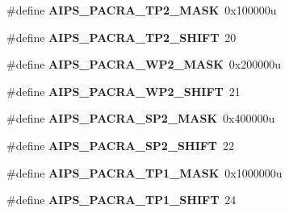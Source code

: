\begin{DoxyCompactItemize}
\item 
\hypertarget{group___a_i_p_s___register___masks_ga9f095d0133106d934d6539734fb4e0bb}{}\#define {\bfseries A\+I\+P\+S\+\_\+\+P\+A\+C\+R\+A\+\_\+\+T\+P2\+\_\+\+M\+A\+S\+K}~0x100000u\label{group___a_i_p_s___register___masks_ga9f095d0133106d934d6539734fb4e0bb}

\item 
\hypertarget{group___a_i_p_s___register___masks_gad59367457d6e0c16362d23b9c09f416b}{}\#define {\bfseries A\+I\+P\+S\+\_\+\+P\+A\+C\+R\+A\+\_\+\+T\+P2\+\_\+\+S\+H\+I\+F\+T}~20\label{group___a_i_p_s___register___masks_gad59367457d6e0c16362d23b9c09f416b}

\item 
\hypertarget{group___a_i_p_s___register___masks_gafb7aafc6a1e9590a2ab3ca9444a6858e}{}\#define {\bfseries A\+I\+P\+S\+\_\+\+P\+A\+C\+R\+A\+\_\+\+W\+P2\+\_\+\+M\+A\+S\+K}~0x200000u\label{group___a_i_p_s___register___masks_gafb7aafc6a1e9590a2ab3ca9444a6858e}

\item 
\hypertarget{group___a_i_p_s___register___masks_ga667bbec8a03882a449090df9e783e134}{}\#define {\bfseries A\+I\+P\+S\+\_\+\+P\+A\+C\+R\+A\+\_\+\+W\+P2\+\_\+\+S\+H\+I\+F\+T}~21\label{group___a_i_p_s___register___masks_ga667bbec8a03882a449090df9e783e134}

\item 
\hypertarget{group___a_i_p_s___register___masks_ga8f13bf1feebb8678421318b1d6dca781}{}\#define {\bfseries A\+I\+P\+S\+\_\+\+P\+A\+C\+R\+A\+\_\+\+S\+P2\+\_\+\+M\+A\+S\+K}~0x400000u\label{group___a_i_p_s___register___masks_ga8f13bf1feebb8678421318b1d6dca781}

\item 
\hypertarget{group___a_i_p_s___register___masks_ga660c0761244438dee4ecdd12e0cb436a}{}\#define {\bfseries A\+I\+P\+S\+\_\+\+P\+A\+C\+R\+A\+\_\+\+S\+P2\+\_\+\+S\+H\+I\+F\+T}~22\label{group___a_i_p_s___register___masks_ga660c0761244438dee4ecdd12e0cb436a}

\item 
\hypertarget{group___a_i_p_s___register___masks_gaa9ebd1bff158d65e3bb7f77c8342da1f}{}\#define {\bfseries A\+I\+P\+S\+\_\+\+P\+A\+C\+R\+A\+\_\+\+T\+P1\+\_\+\+M\+A\+S\+K}~0x1000000u\label{group___a_i_p_s___register___masks_gaa9ebd1bff158d65e3bb7f77c8342da1f}

\item 
\hypertarget{group___a_i_p_s___register___masks_ga628f05d8495846197d30edcf2f2b8124}{}\#define {\bfseries A\+I\+P\+S\+\_\+\+P\+A\+C\+R\+A\+\_\+\+T\+P1\+\_\+\+S\+H\+I\+F\+T}~24\label{group___a_i_p_s___register___masks_ga628f05d8495846197d30edcf2f2b8124}


\end{DoxyCompactItemize}
